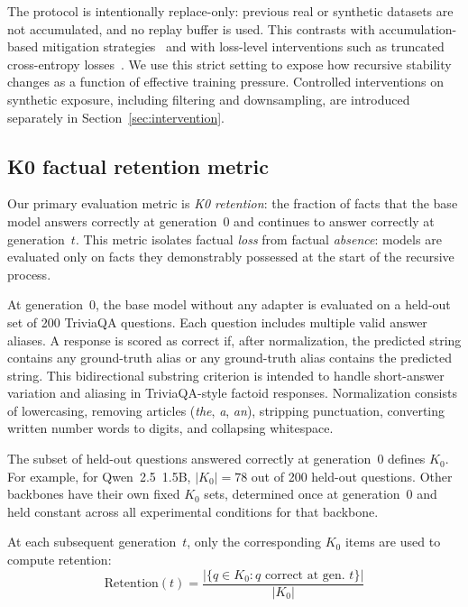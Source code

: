 \documentclass[a4paper,fleqn]{cas-dc}
\begin{document}
The protocol is intentionally replace-only: previous real or synthetic datasets
are not accumulated, and no replay buffer is used. This contrasts with
accumulation-based mitigation strategies~\citep{gerstgrasser2024} and with
loss-level interventions such as truncated cross-entropy
losses~\citep{zibakhsh2024}. We use this strict setting to expose how recursive
stability changes as a function of effective training pressure. Controlled
interventions on synthetic exposure, including filtering and downsampling, are
introduced separately in Section~\ref{sec:intervention}.

\subsection{K0 factual retention metric}\label{sec:k0}

Our primary evaluation metric is \textit{K0 retention}: the fraction of
facts that the base model answers correctly at generation~0 and continues to
answer correctly at generation~$t$. This metric isolates factual
\textit{loss} from factual \textit{absence}: models are evaluated only on
facts they demonstrably possessed at the start of the recursive process.

At generation~0, the base model without any adapter is evaluated on a held-out
set of 200 TriviaQA questions. Each question includes multiple valid answer
aliases. A response is scored as correct if, after normalization, the predicted
string contains any ground-truth alias or any ground-truth alias contains the
predicted string. This bidirectional substring criterion is intended to handle
short-answer variation and aliasing in TriviaQA-style factoid responses.
Normalization consists of lowercasing, removing articles
(\textit{the}, \textit{a}, \textit{an}), stripping punctuation, converting
written number words to digits, and collapsing whitespace.

The subset of held-out questions answered correctly at generation~0 defines
$K_0$. For example, for Qwen~2.5~1.5B, $|K_0|=78$ out of 200 held-out
questions. Other backbones have their own fixed $K_0$ sets, determined once at
generation~0 and held constant across all experimental conditions for that
backbone.

At each subsequent generation~$t$, only the corresponding $K_0$ items are used
to compute retention:
\begin{equation}\label{eq:k0}
  \mathrm{Retention}(t) =
  \frac{|\{q \in K_0 : q \text{ correct at gen.\ } t\}|}{|K_0|}
\end{equation}
\end{document}
